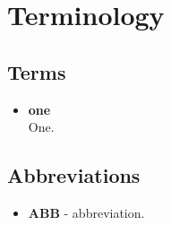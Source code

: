 \chapter*{Terminology}

\section*{Terms}

\begin{itemize}
    \setlength\itemsep{1px}
    \item \textbf{one} \\
    One.
    
\end{itemize}

\section*{Abbreviations}

\begin{itemize}
    \setlength\itemsep{1px}
    \item \textbf{ABB} - abbreviation.

\end{itemize}



